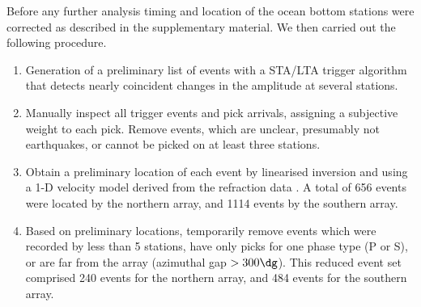\documentclass[reviewcopy]{elsart}
\begin{document}
Before any further analysis timing and location of the ocean bottom
stations were corrected as described in the supplementary material. We
then carried out the following procedure.
\begin{enumerate}
\item Generation of  a preliminary list of events
with a STA/LTA trigger algorithm that  detects nearly
coincident changes in the amplitude at several stations.  
\item Manually inspect all trigger events and pick arrivals, assigning
a subjective weight to each pick. Remove
events, which are unclear, presumably not earthquakes, or cannot be
picked on at least three stations. 
\item Obtain a preliminary location of each event by linearised
inversion and using a 1-D velocity model derived from the refraction
data \citep{scherwath06}.  
A total of 656 events were located by the northern array, and 1114
events by the southern array.
\item Based on preliminary locations, temporarily remove events which
  were recorded by less than 5 stations, have only picks for one phase
  type (P or S), or are far from the array (azimuthal gap
  $>300\dg$).
 This reduced event set comprised 240  events for the
  northern array, and 484 events for the southern array.


\end{enumerate}
\end{document}
